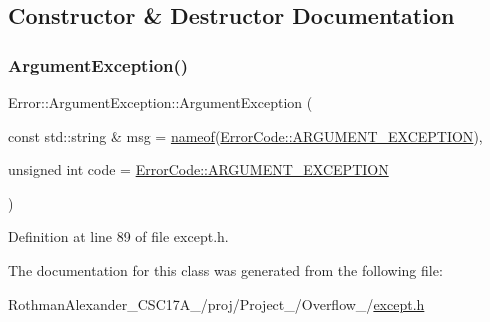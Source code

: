 \subsection{Constructor \& Destructor Documentation}
\hypertarget{class_error_1_1_argument_exception_a8f9378ee53dbfc35253d3b3e9625ad3e}{}\label{class_error_1_1_argument_exception_a8f9378ee53dbfc35253d3b3e9625ad3e} 
\subsubsection{\texorpdfstring{Argument\+Exception()}{ArgumentException()}}
{\footnotesize\ttfamily Error\+::\+Argument\+Exception\+::\+Argument\+Exception (\begin{DoxyParamCaption}\item[{const std\+::string \&}]{msg = {\ttfamily \hyperlink{macros_8h_a235bdec0a6bf62f3b3af87e528109847}{nameof}(\hyperlink{namespace_error_1_1_error_code_acf46c5671e39c66ef96a9a701c8cb91f}{Error\+Code\+::\+A\+R\+G\+U\+M\+E\+N\+T\+\_\+\+E\+X\+C\+E\+P\+T\+I\+ON})},  }\item[{unsigned int}]{code = {\ttfamily \hyperlink{namespace_error_1_1_error_code_acf46c5671e39c66ef96a9a701c8cb91f}{Error\+Code\+::\+A\+R\+G\+U\+M\+E\+N\+T\+\_\+\+E\+X\+C\+E\+P\+T\+I\+ON}} }\end{DoxyParamCaption})\hspace{0.3cm}{\ttfamily [inline]}}



Definition at line 89 of file except.\+h.



The documentation for this class was generated from the following file\+:\begin{DoxyCompactItemize}
\item 
Rothman\+Alexander\+\_\+\+C\+S\+C17\+A\+\_/proj/\+Project\+\_/\+Overflow\+\_/\hyperlink{except_8h}{except.\+h}\end{DoxyCompactItemize}
